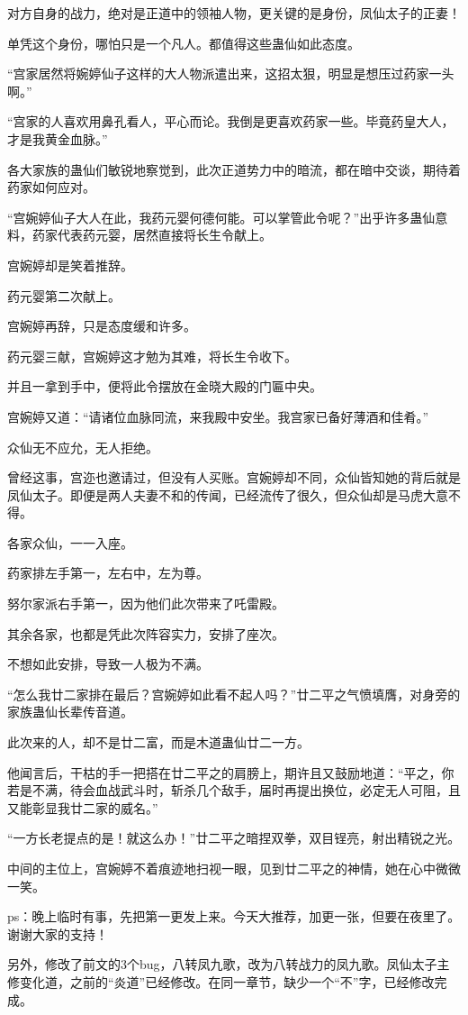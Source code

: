 \begin{this_body}
对方自身的战力，绝对是正道中的领袖人物，更关键的是身份，凤仙太子的正妻！

单凭这个身份，哪怕只是一个凡人。都值得这些蛊仙如此态度。

“宫家居然将婉婷仙子这样的大人物派遣出来，这招太狠，明显是想压过药家一头啊。”

“宫家的人喜欢用鼻孔看人，平心而论。我倒是更喜欢药家一些。毕竟药皇大人，才是我黄金血脉。”

各大家族的蛊仙们敏锐地察觉到，此次正道势力中的暗流，都在暗中交谈，期待着药家如何应对。

“宫婉婷仙子大人在此，我药元婴何德何能。可以掌管此令呢？”出乎许多蛊仙意料，药家代表药元婴，居然直接将长生令献上。

宫婉婷却是笑着推辞。

药元婴第二次献上。

宫婉婷再辞，只是态度缓和许多。

药元婴三献，宫婉婷这才勉为其难，将长生令收下。

并且一拿到手中，便将此令摆放在金晓大殿的门匾中央。

宫婉婷又道：“请诸位血脉同流，来我殿中安坐。我宫家已备好薄酒和佳肴。”

众仙无不应允，无人拒绝。

曾经这事，宫迩也邀请过，但没有人买账。宫婉婷却不同，众仙皆知她的背后就是凤仙太子。即便是两人夫妻不和的传闻，已经流传了很久，但众仙却是马虎大意不得。

各家众仙，一一入座。

药家排左手第一，左右中，左为尊。

努尔家派右手第一，因为他们此次带来了吒雷殿。

其余各家，也都是凭此次阵容实力，安排了座次。

不想如此安排，导致一人极为不满。

“怎么我廿二家排在最后？宫婉婷如此看不起人吗？”廿二平之气愤填膺，对身旁的家族蛊仙长辈传音道。

此次来的人，却不是廿二富，而是木道蛊仙廿二一方。

他闻言后，干枯的手一把搭在廿二平之的肩膀上，期许且又鼓励地道：“平之，你若是不满，待会血战武斗时，斩杀几个敌手，届时再提出换位，必定无人可阻，且又能彰显我廿二家的威名。”

“一方长老提点的是！就这么办！”廿二平之暗捏双拳，双目锃亮，射出精锐之光。

中间的主位上，宫婉婷不着痕迹地扫视一眼，见到廿二平之的神情，她在心中微微一笑。

ps：晚上临时有事，先把第一更发上来。今天大推荐，加更一张，但要在夜里了。谢谢大家的支持！

另外，修改了前文的3个bug，八转凤九歌，改为八转战力的凤九歌。凤仙太子主修变化道，之前的“炎道”已经修改。在同一章节，缺少一个“不”字，已经修改完成。

\end{this_body}

